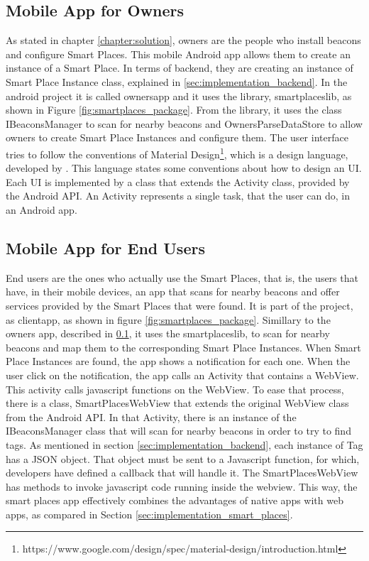 \subsection{Mobile App for Owners}
\label{sub:implementation_mobile_app_for_owners}
As stated in chapter \ref{chapter:solution}, owners are the people who install beacons and configure Smart Places. This mobile Android app allows them to create an instance of a Smart Place.
In terms of backend, they are creating an instance of Smart Place Instance class, explained in \ref{sec:implementation_backend}.
In the android project it is called ownersapp and it uses the library, smartplaceslib, as shown in Figure \ref{fig:smartplaces_package}.
From the library, it uses the class IBeaconsManager to scan for nearby beacons and OwnersParseDataStore to allow owners to create Smart Place Instances and configure them.
The user interface tries to follow the conventions of Material Design\footnote{https://www.google.com/design/spec/material-design/introduction.html}, which is a design language, developed by .
This language states some conventions about how to design an \gls{UI}.
Each \gls{UI} is implemented by a class that extends the Activity class, provided by the Android \gls{API}.
An Activity represents a single task, that the user can do, in an Android app.

\subsection{Mobile App for End Users}
\label{sub:implementation_mobile_app_for_end_users}
End users are the ones who actually use the Smart Places, that is, the users that have, in their mobile devices, an app that scans for nearby beacons and offer services provided by the Smart Places that were found.
It is part of the project, as clientapp, as shown in figure \ref{fig:smartplaces_package}. Simillary to the owners app, described in \ref{sub:implementation_mobile_app_for_owners}, it uses the smartplaceslib, to scan for nearby beacons and map them to the corresponding Smart Place Instances.
When Smart Place Instances are found, the app shows a notification for each one.
When the user click on the notification, the app calls an Activity that contains a WebView. This activity calls javascript functions on the WebView.
To ease that process, there is a class, SmartPlacesWebView that extends the original WebView class from the Android \gls{API}.
In that Activity, there is an instance of the IBeaconsManager class that will scan for nearby beacons in order to try to find tags. As mentioned in section \ref{sec:implementation_backend},
each instance of Tag has a \gls{JSON} object. That object must be sent to a Javascript function, for which, developers have defined a callback that will handle it. The SmartPlacesWebView has methods to invoke javascript code running inside the webview.
This way, the smart places app effectively combines the advantages of native apps with web apps, as compared in Section \ref{sec:implementation_smart_places}.

